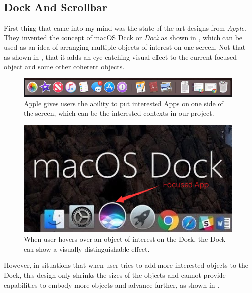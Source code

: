 \subsection{Dock And Scrollbar}

First thing that came into my mind was the state-of-the-art designs from \emph{Apple}. They invented the concept of macOS Dock or \emph{Dock} as shown in , which can be used as an idea of arranging multiple objects of interest on one screen. Not that as shown in , that it adds an eye-catching visual effect to the current focused object and some other coherent objects.

\begin{figure}[th]
\centering
\includegraphics[width=\textwidth,keepaspectratio]{Figures/Chapter1/macosdock1.png}
\decoRule
\caption[MacOS Dock]{Apple gives users the ability to put interested Apps on one side of the screen, which can be the interested contexts in our project.}
\label{fig:macosdock1}
\end{figure}

\begin{figure}[th]
\centering
\includegraphics{Figures/Chapter1/macosdock1-1.png}
\decoRule
\caption[MacOS Dock Hover]{When user hovers over an object of interest on the Dock, the Dock can show a visually distinguishable effect.}
\label{fig:macosdock1-1}
\end{figure}

However, in situations that when user tries to add more interested objects to the Dock, this design only shrinks the sizes of the objects and cannot provide capabilities to embody more objects and advance further, as shown in .

